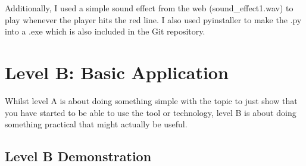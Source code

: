 \documentclass[a4paper, 11pt]{report}
\begin{document}
\begin{figure}[!htb]%
    \centering
    \qquad
\end{figure}

Additionally, I used a simple sound effect from the web (sound\_effect1.wav) to play whenever the player hits the red line. I also used pyinstaller to make the .py into a .exe which is also included in the Git repository.


\newpage
\section{Level B: Basic Application}

Whilst level A is about doing something simple with the topic to just show that you have started to be able to use the tool or technology, level B is about doing something practical that might actually be useful.

\subsection{Level B Demonstration}
\end{document}
